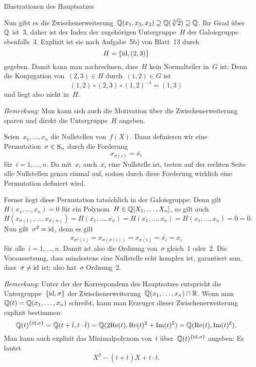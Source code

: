 \documentclass{algblatt}
\begin{document}
\begin{aufgabe}{Illustrationen des Hauptsatzes}
\begin{loesungE}
Nun gibt es die Zwischenerweiterung~$\mathbb{Q}(x_1,x_2,x_3) \supseteq
\mathbb{Q}(\sqrt[3]{2}) \supseteq \mathbb{Q}$. Ihr Grad über~$\mathbb{Q}$ ist~$3$, daher ist der
Index der zugehörigen Untergruppe~$H$ der Galoisgruppe ebenfalls~$3$. Explizit ist
sie nach Aufgabe~5b) von Blatt~13 durch
\[ H = \{ \mathrm{id}, (2, 3) \} \]
gegeben. Damit kann man nachrechnen, dass~$H$ kein Normalteiler
in~$G$ ist: Denn die Konjugation von~$(2,3) \in H$
durch~$(1,2) \in G$ ist
\[ (1,2) \circ (2,3) \circ (1,2)^{-1} =
  (1,3) \]
und liegt also nicht in~$H$.

\emph{Bemerkung:} Man kann sich auch die Motivation über die
Zwischenerweiterung sparen und direkt die Untergruppe~$H$ angeben.

\item Seien~$x_1,\ldots,x_n$ die Nullstellen von~$f(X)$. Dann definieren wir
eine Permutation~$\sigma \in \mathrm{S}_n$ durch die Forderung
\[ x_{\sigma(i)} = \overline{x_i} \]
für~$i = 1,\ldots,n$. Da mit~$x_i$ auch~$\overline{x_i}$ eine Nullstelle ist,
treten auf der rechten Seite alle Nullstellen genau einmal auf, sodass durch
diese Forderung wirklich eine Permutation definiert wird.

Ferner liegt diese Permutation tatsächlich in der Galoisgruppe: Denn
gilt~$H(x_1,\ldots,x_n) = 0$ für ein Polynom~$H \in \mathbb{Q}[X_1,\ldots,X_n]$, so
gilt auch
\[ H(x_{\sigma(1)},\ldots,x_{\sigma(n)}) =
  H(\overline{x_1},\ldots,\overline{x_n}) =
  \overline{H}(\overline{x_1},\ldots,\overline{x_n}) =
  \overline{H(x_1,\ldots,x_n)} =
  \overline{0} = 0. \]
Nun gilt~$\sigma^2 = \mathrm{id}$, denn es gilt
\[ x_{\sigma^2(i)} = x_{\sigma(\sigma(i))} = \overline{x_{\sigma(i)}} =
\overline{\overline{x_i}} = x_i \]
für alle~$i = 1,\ldots,n$. Damit ist also die Ordnung von~$\sigma$ gleich~$1$
oder~$2$. Die Voraussetzung, dass mindestens eine Nullstelle echt komplex ist,
garantiert nun, dass~$\sigma \neq \mathrm{id}$ ist; also hat~$\sigma$ Ordnung~$2$.

\emph{Bemerkung:} Unter der der Korrespondenz des Hauptsatzes entspricht die
Untergruppe~$\{\mathrm{id},\sigma\}$ der Zwischenerweiterung~$\mathbb{Q}(x_1,\ldots,x_n) \cap
\mathbb{R}$. Wenn man~$\mathbb{Q}(t) = \mathbb{Q}(x_1,\ldots,x_n)$ schreibt, kann man Erzeuger
dieser Zwischenerweiterung explizit bestimmen:
\[ \mathbb{Q}(t)^{\{\mathrm{id},\sigma\}} = \mathbb{Q}(t + \overline{t}, t \cdot \overline{t}) =
  \mathbb{Q}(2 \mathrm{Re}(t), \mathrm{Re}(t)^2 + \mathrm{Im}(t)^2) =
  \mathbb{Q}(\mathrm{Re}(t), \mathrm{Im}(t)^2). \]
Man kann auch explizit das Minimalpolynom von~$t$
über~$\mathbb{Q}(t)^{\{\mathrm{id},\sigma\}}$ angeben: Es lautet
\[ X^2 - (t + \overline{t}) X + t \cdot \overline{t}. \]


\end{loesungE}
\end{aufgabe}
\end{document}
